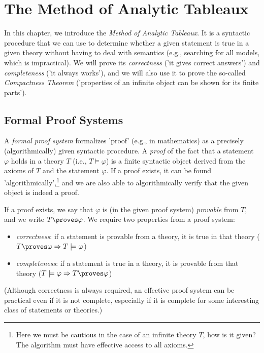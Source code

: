 \chapter{The Method of Analytic Tableaux}
\label{chapter:tableau-method-propositional}


In this chapter, we introduce the \emph{Method of Analytic Tableaux}. It is a syntactic procedure that we can use to determine whether a given statement is true in a given theory without having to deal with semantics (e.g., searching for all models, which is impractical). We will prove its \emph{correctness} ('it gives correct answers') and \emph{completeness} ('it always works'), and we will also use it to prove the so-called \emph{Compactness Theorem} ('properties of an infinite object can be shown for its finite parts').

\section{Formal Proof Systems}

A \emph{formal proof system} formalizes 'proof' (e.g., in mathematics) as a precisely (algorithmically) given syntactic procedure. A \emph{proof} of the fact that a statement $\varphi$ holds in a theory $T$ (i.e., $T \models \varphi$) is a finite syntactic object derived from the axioms of $T$ and the statement $\varphi$. If a proof exists, it can be found 'algorithmically',\footnote{Here we must be cautious in the case of an infinite theory $T$, how is it given? The algorithm must have effective access to all axioms.} and we are also able to algorithmically verify that the given object is indeed a proof.

If a proof exists, we say that $\varphi$ is (in the given proof system) \emph{provable} from $T$, and we write $T \proves \varphi$. We require two properties from a proof system:
\begin{itemize}
    \item \emph{correctness}: if a statement is provable from a theory, it is true in that theory ($T \proves \varphi \Rightarrow T \models \varphi$)
    \item \emph{completeness}: if a statement is true in a theory, it is provable from that theory ($T \models \varphi \Rightarrow T \proves \varphi$)
\end{itemize}
(Although correctness is always required, an effective proof system can be practical even if it is not complete, especially if it is complete for some interesting class of statements or theories.)

